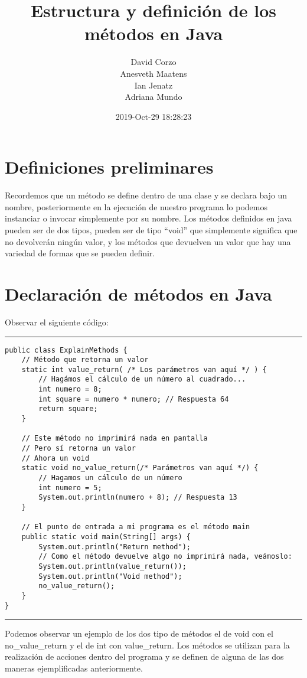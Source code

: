 \documentclass{article}
\title{Estructura y definición de los métodos en Java}
\author{David Corzo \\ Anesveth Maatens \\ Ian Jenatz \\ Adriana Mundo}
\date{2019-Oct-29 18:28:23}
\begin{document}
\maketitle


\section{Definiciones preliminares}
Recordemos que un método se define dentro de una clase y se declara bajo un nombre, posteriormente en la ejecución de nuestro programa lo podemos instanciar o invocar simplemente por su nombre. Los métodos definidos en java pueden ser de dos tipos, pueden ser de tipo ``void'' que simplemente significa que no devolverán ningún valor, y los métodos que devuelven un valor que hay una variedad de formas que se pueden definir.



\section{Declaración de métodos en Java}
Observar el siguiente código: \newline 
\rule{16cm}{1pt}
\begin{verbatim}
public class ExplainMethods {
    // Método que retorna un valor
    static int value_return( /* Los parámetros van aquí */ ) {
        // Hagámos el cálculo de un número al cuadrado...
        int numero = 8;
        int square = numero * numero; // Respuesta 64
        return square;
    }

    // Este método no imprimirá nada en pantalla
    // Pero sí retorna un valor
    // Ahora un void
    static void no_value_return(/* Parámetros van aquí */) {
        // Hagamos un cálculo de un número
        int numero = 5;
        System.out.println(numero + 8); // Respuesta 13
    }

    // El punto de entrada a mi programa es el método main
    public static void main(String[] args) {
        System.out.println("Return method");
        // Como el método devuelve algo no imprimirá nada, veámoslo:
        System.out.println(value_return());
        System.out.println("Void method");
        no_value_return();
    }
}
\end{verbatim}
\rule{16cm}{1pt}\newline 
Podemos observar un ejemplo de los dos tipo de métodos el de void con el no\_value\_return y el de int con value\_return. Los métodos se utilizan para la realización de acciones dentro del programa y se definen de alguna de las dos maneras ejemplificadas anteriormente.
\end{document}
